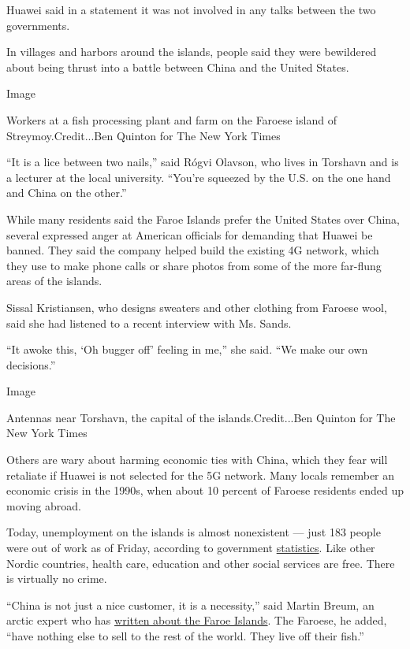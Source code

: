 Huawei said in a statement it was not involved in any talks between the
two governments.

In villages and harbors around the islands, people said they were
bewildered about being thrust into a battle between China and the United
States.

Image

Workers at a fish processing plant and farm on the Faroese island of
Streymoy.Credit...Ben Quinton for The New York Times

``It is a lice between two nails,'' said Rógvi Olavson, who lives in
Torshavn and is a lecturer at the local university. ``You're squeezed by
the U.S. on the one hand and China on the other.''

While many residents said the Faroe Islands prefer the United States
over China, several expressed anger at American officials for demanding
that Huawei be banned. They said the company helped build the existing
4G network, which they use to make phone calls or share photos from some
of the more far-flung areas of the islands.

Sissal Kristiansen, who designs sweaters and other clothing from Faroese
wool, said she had listened to a recent interview with Ms. Sands.

``It awoke this, `Oh bugger off' feeling in me,'' she said. ``We make
our own decisions.''

Image

Antennas near Torshavn, the capital of the islands.Credit...Ben Quinton
for The New York Times

Others are wary about harming economic ties with China, which they fear
will retaliate if Huawei is not selected for the 5G network. Many locals
remember an economic crisis in the 1990s, when about 10 percent of
Faroese residents ended up moving abroad.

Today, unemployment on the islands is almost nonexistent --- just 183
people were out of work as of Friday, according to government
\href{https://www.als.fo/}{statistics}. Like other Nordic countries,
health care, education and other social services are free. There is
virtually no crime.

``China is not just a nice customer, it is a necessity,'' said Martin
Breum, an arctic expert who has
\href{https://www.mqup.ca/cold-rush-products-9780773553637.php?page_id=73\&}{written
about the Faroe Islands}. The Faroese, he added, ``have nothing else to
sell to the rest of the world. They live off their fish.''

